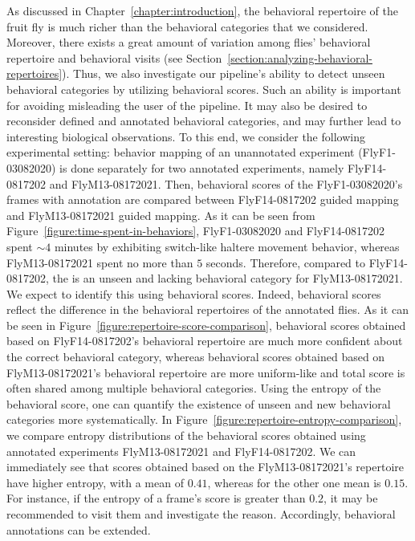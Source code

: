 As discussed in Chapter~\ref{chapter:introduction}, the behavioral repertoire of the fruit fly is much richer than the behavioral categories that we considered.
Moreover, there exists a great amount of variation among flies' behavioral repertoire and behavioral visits (see Section~\ref{section:analyzing-behavioral-repertoires}).
Thus, we also investigate our pipeline's ability to detect unseen behavioral categories by utilizing behavioral scores.
Such an ability is important for avoiding misleading the user of the pipeline. It may also be desired to reconsider defined and annotated behavioral categories, and may further lead to interesting biological observations.
To this end, we consider the following experimental setting: behavior mapping of an unannotated experiment (FlyF1-03082020) is done separately for two annotated experiments, namely FlyF14-0817202 and FlyM13-08172021.
Then, behavioral scores of the FlyF1-03082020's frames with \HaltereSwitch annotation are compared between FlyF14-0817202 guided mapping and FlyM13-08172021 guided mapping.
As it can be seen from Figure~\ref{figure:time-spent-in-behaviors}, FlyF1-03082020 and FlyF14-0817202 spent ${\sim}4$ minutes by exhibiting switch-like haltere movement behavior, whereas FlyM13-08172021 spent no more than $5$ seconds.
Therefore, compared to FlyF14-0817202, the \HaltereSwitch is an unseen and lacking behavioral category for FlyM13-08172021.
We expect to identify this using behavioral scores.
Indeed, behavioral scores reflect the difference in the behavioral repertoires of the annotated flies.
As it can be seen in Figure~\ref{figure:repertoire-score-comparison}, behavioral scores obtained based on FlyF14-0817202's behavioral repertoire are much more confident about the correct behavioral category, whereas behavioral scores obtained based on FlyM13-08172021's behavioral repertoire are more uniform-like and total score is often shared among multiple behavioral categories.
Using the entropy of the behavioral score, one can quantify the existence of unseen and new behavioral categories more systematically.
In Figure~\ref{figure:repertoire-entropy-comparison}, we compare entropy distributions of the behavioral scores obtained using annotated experiments FlyM13-08172021 and FlyF14-0817202.
We can immediately see that scores obtained based on the FlyM13-08172021's repertoire have higher entropy, with a mean of $0.41$, whereas for the other one mean is $0.15$.
For instance, if the entropy of a frame's score is greater than $0.2$, it may be recommended to visit them and investigate the reason.
Accordingly, behavioral annotations can be extended.

